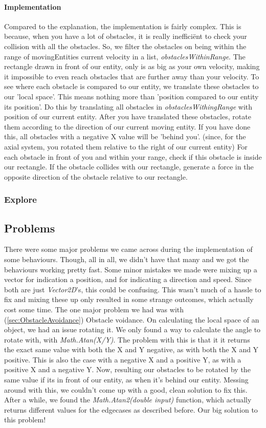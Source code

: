\paragraph{Implementation}
Compared to the explanation, the implementation is fairly complex.
This is because, when you have a lot of obstacles, it is really ineffici\"ent to check your collision with all the obstacles.
So, we filter the obstacles on being within the range of movingEntities current velocity in a list, \textit{obstaclesWithinRange}.
The rectangle drawn in front of our entity, only is as big as your own velocity, making it impossible to even reach obstacles that are further away than your velocity.
To see where each obstacle is compared to our entity, we translate these obstacles to our 'local space'.
This means nothing more than 'position compared to our entity its position'.
Do this by translating all obstacles in \textit{obstaclesWithingRange} with position of our current entity.
After you have translated these obstacles, rotate them according to the direction of our current moving entity.
If you have done this, all obstacles with a negative X value will be 'behind you'. (since, for the axial system, you rotated them relative to the right of our current entity)
For each obstacle in front of you and within your range, check if this obstacle is inside our rectangle.
If the obstacle collides with our rectangle, generate a force in the opposite direction of the obstacle relative to our rectangle.
\subsubsection{Explore}
\subsection[Problems we had during implementing these behaviours]{Problems}\label{subsec:problems}
There were some major problems we came across during the implementation of some behaviours.
Though, all in all, we didn't have that many and we got the behaviours working pretty fast.
Some minor mistakes we made were mixing up a vector for indication a position, and for indicating a direction and speed.
Since both are just \textit{Vector2D}'s, this could be confusing.
This wasn't much of a hassle to fix and mixing these up only resulted in some strange outcomes, which actually cost some time.
The one major problem we had was with (\ref{sec:ObstacleAvoidance}) Obstacle voidance.
On calculating the local space of an object, we had an issue rotating it.
We only found a way to calculate the angle to rotate with, with \textit{Math.Atan(X/Y)}.
The problem with this is that it it returns the exact same value with both the X and Y negative, as with both the X and Y positive.
This is also the case with a negative X and a positive Y, as with a positive X and a negative Y.
Now, resulting our obstacles to be rotated by the same value if its in front of our entity, as when it's behind our entity.
Messing around with this, we couldn't come up with a good, clean solution to fix this.
After a while, we found the \textit{Math.Atan2(double input)} function, which actually returns different values for the edgecases as described before.
Our big solution to this problem!
